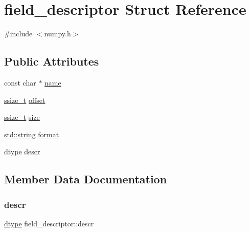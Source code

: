 \hypertarget{structfield__descriptor}{}\section{field\+\_\+descriptor Struct Reference}
\label{structfield__descriptor}


{\ttfamily \#include $<$numpy.\+h$>$}

\subsection*{Public Attributes}
\begin{DoxyCompactItemize}
\item 
const char $\ast$ \mbox{\hyperlink{structfield__descriptor_a2b8d0e45646daa97e6730819f5556c12}{name}}
\item 
\mbox{\hyperlink{detail_2common_8h_ac430d16fc097b3bf0a7469cfd09decda}{ssize\+\_\+t}} \mbox{\hyperlink{structfield__descriptor_a3b43f6fd295c953e0dc7284d042b9dbf}{offset}}
\item 
\mbox{\hyperlink{detail_2common_8h_ac430d16fc097b3bf0a7469cfd09decda}{ssize\+\_\+t}} \mbox{\hyperlink{structfield__descriptor_ab74ae9e9a3dc6856c5a839abc26c108b}{size}}
\item 
\mbox{\hyperlink{_s_d_l__opengl__glext_8h_ab4ccfaa8ab0e1afaae94dc96ef52dde1}{std\+::string}} \mbox{\hyperlink{structfield__descriptor_a62ccb1dd21c92d24369e9cbdc66b659b}{format}}
\item 
\mbox{\hyperlink{classdtype}{dtype}} \mbox{\hyperlink{structfield__descriptor_ac064bb6739b0968db35585c230f28f65}{descr}}
\end{DoxyCompactItemize}


\subsection{Member Data Documentation}
\mbox{\label{structfield__descriptor_ac064bb6739b0968db35585c230f28f65}} 
\subsubsection{\texorpdfstring{descr}{descr}}
{\footnotesize\ttfamily \mbox{\hyperlink{classdtype}{dtype}} field\+\_\+descriptor\+::descr}

\mbox{\label{structfield__descriptor_a62ccb1dd21c92d24369e9cbdc66b659b}} 
